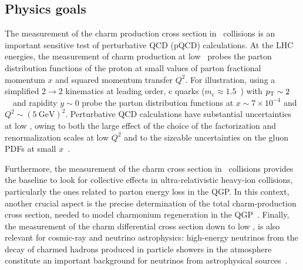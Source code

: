 \documentclass[12pt, a4paper, twoside, titlepage]{article}
\begin{document}
\subsection{Physics goals}
The measurement of the charm production cross section in \pp\ collisions is an important sensitive test of perturbative QCD (pQCD) calculations.
At the LHC energies, the measurement of charm production at low \pt\ probes the parton distribution functions
of the proton at small values of parton fractional momentum $x$ and squared momentum transfer $Q^2$.
For illustration, using a simplified $2 \rightarrow 2$ kinematics at leading order, c quarks ($m_{\mathrm{c}} \approx 1.5$~\GeVcsq) with
$p_{\rm T} \sim 2$~\GeVc\ and rapidity $y \sim 0$ probe the parton distribution functions at $x \sim 7 \times 10^{-4}$ and
$Q^2 \sim (5~\mathrm{GeV})^2$.
Perturbative QCD calculations have substantial uncertainties at low \pt, owing to both the large effect of the
choice of the factorization and renormalization scales at low $Q^2$ and to the sizeable uncertainties on the
gluon PDFs at small $x$~\cite{}. 

Furthermore, the measurement of the charm cross section in \pp\ collisions provides the baseline to look for collective effects in ultra-relativistic
heavy-ion collisions, particularly the ones related to parton energy loss in the QGP. In this context, another crucial aspect is the precise determination of the
total charm-production cross section, needed to model charmonium regeneration in the QGP~\cite{}.
Finally, the measurement of the charm differential cross section down to low \pt, is also relevant for cosmic-ray and neutrino
astrophysics: high-energy neutrinos from the decay of charmed hadrons produced in particle showers in the atmosphere constitute an important
background for neutrinos from astrophysical sources~\cite{}.
\end{document}
